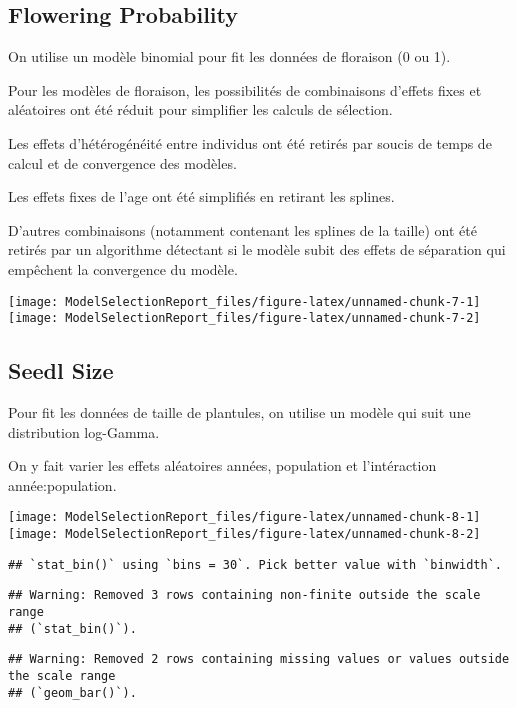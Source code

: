 \documentclass[
]{article}
\begin{document}
\subsection{Flowering Probability}\label{flowering-probability}

On utilise un modèle binomial pour fit les données de floraison (0 ou
1).

Pour les modèles de floraison, les possibilités de combinaisons d'effets
fixes et aléatoires ont été réduit pour simplifier les calculs de
sélection.

Les effets d'hétérogénéité entre individus ont été retirés par soucis de
temps de calcul et de convergence des modèles.

Les effets fixes de l'age ont été simplifiés en retirant les splines.

D'autres combinaisons (notamment contenant les splines de la taille) ont
été retirés par un algorithme détectant si le modèle subit des effets de
séparation qui empêchent la convergence du modèle.

\texttt{[image: ModelSelectionReport\_files/figure-latex/unnamed-chunk-7-1]}
\texttt{[image: ModelSelectionReport\_files/figure-latex/unnamed-chunk-7-2]}

\subsection{Seedl Size}\label{seedl-size}

Pour fit les données de taille de plantules, on utilise un modèle qui
suit une distribution log-Gamma.

On y fait varier les effets aléatoires années, population et
l'intéraction année:population.

\texttt{[image: ModelSelectionReport\_files/figure-latex/unnamed-chunk-8-1]}
\texttt{[image: ModelSelectionReport\_files/figure-latex/unnamed-chunk-8-2]}

\begin{verbatim}
## `stat_bin()` using `bins = 30`. Pick better value with `binwidth`.
\end{verbatim}

\begin{verbatim}
## Warning: Removed 3 rows containing non-finite outside the scale range
## (`stat_bin()`).
\end{verbatim}

\begin{verbatim}
## Warning: Removed 2 rows containing missing values or values outside the scale range
## (`geom_bar()`).
\end{verbatim}
\end{document}
